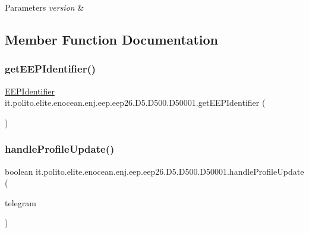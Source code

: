 \begin{DoxyParams}{Parameters}
{\em version} & \\
\hline
\end{DoxyParams}


\subsection{Member Function Documentation}
\hypertarget{classit_1_1polito_1_1elite_1_1enocean_1_1enj_1_1eep_1_1eep26_1_1_d5_1_1_d500_1_1_d50001_aeec49085ef79faafac0e9b3b2d19d259}{}\label{classit_1_1polito_1_1elite_1_1enocean_1_1enj_1_1eep_1_1eep26_1_1_d5_1_1_d500_1_1_d50001_aeec49085ef79faafac0e9b3b2d19d259} 
\subsubsection{\texorpdfstring{get\+E\+E\+P\+Identifier()}{getEEPIdentifier()}}
{\footnotesize\ttfamily \hyperlink{classit_1_1polito_1_1elite_1_1enocean_1_1enj_1_1eep_1_1_e_e_p_identifier}{E\+E\+P\+Identifier} it.\+polito.\+elite.\+enocean.\+enj.\+eep.\+eep26.\+D5.\+D500.\+D50001.\+get\+E\+E\+P\+Identifier (\begin{DoxyParamCaption}{ }\end{DoxyParamCaption})}

\hypertarget{classit_1_1polito_1_1elite_1_1enocean_1_1enj_1_1eep_1_1eep26_1_1_d5_1_1_d500_1_1_d50001_ad5eca374f9561f4974bda20b6e9fdd72}{}\label{classit_1_1polito_1_1elite_1_1enocean_1_1enj_1_1eep_1_1eep26_1_1_d5_1_1_d500_1_1_d50001_ad5eca374f9561f4974bda20b6e9fdd72} 
\subsubsection{\texorpdfstring{handle\+Profile\+Update()}{handleProfileUpdate()}}
{\footnotesize\ttfamily boolean it.\+polito.\+elite.\+enocean.\+enj.\+eep.\+eep26.\+D5.\+D500.\+D50001.\+handle\+Profile\+Update (\begin{DoxyParamCaption}\item[{\hyperlink{classit_1_1polito_1_1elite_1_1enocean_1_1enj_1_1eep_1_1eep26_1_1telegram_1_1_e_e_p26_telegram}{E\+E\+P26\+Telegram}}]{telegram }\end{DoxyParamCaption})}



